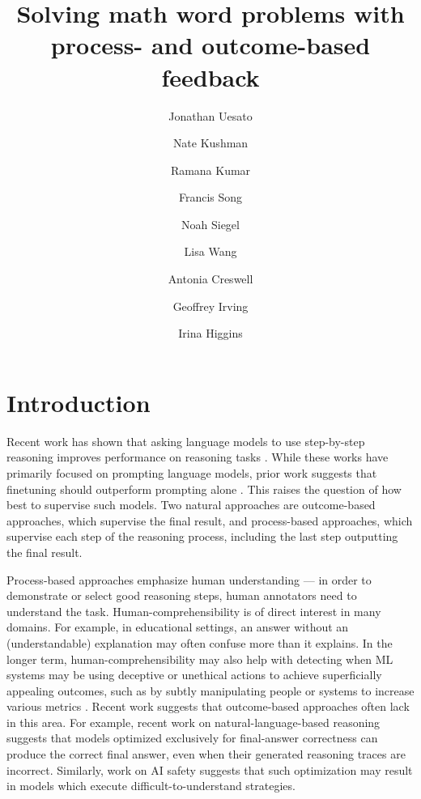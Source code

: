 \documentclass[11pt, a4paper, logo]{deepmind}
\title{Solving math word problems with process- and outcome-based feedback}
\author[1*]{Jonathan Uesato}
\author[1*]{Nate Kushman}
\author[1*]{Ramana Kumar}
\author[1]{Francis Song}
\author[1]{Noah Siegel}
\author[1]{Lisa Wang}
\author[1]{Antonia Creswell}
\author[1]{Geoffrey Irving}
\author[1]{Irina Higgins}
\affil[1]{DeepMind}
\affil[*]{Equal contributions}
\begin{document}
\maketitle

\section{Introduction}
\label{sec:intro}

Recent work has shown that asking language models to use step-by-step reasoning improves performance on reasoning tasks \citep{shwartz2020unsupervised, nakano2021webgpt, cobbe2021training, wei2022chain, kojima2022large, minerva2022}.
While these works have primarily focused on prompting language models, prior work suggests that finetuning should outperform prompting alone \citep{stiennon2020learning, perez2021true, ouyang2022training}.
This raises the question of how best to supervise such models.
Two natural approaches are outcome-based approaches, which supervise the final result, and process-based approaches, which supervise each step of the reasoning process, including the last step outputting the final result.

Process-based approaches emphasize human understanding --- in order to demonstrate or select good reasoning steps, human annotators need to understand the task. Human-comprehensibility is of direct interest in many domains. For example, in educational settings, an answer without an (understandable) explanation may often confuse more than it explains. In the longer term, human-comprehensibility may also help with detecting when ML systems may be using deceptive or unethical actions to achieve superficially appealing outcomes, such as by subtly manipulating people or systems to increase various metrics \citep{amodei2016concrete}. Recent work suggests that outcome-based approaches often lack in this area. For example, recent work on natural-language-based reasoning \citep{zelikman2022star, creswell2022selection} suggests that 
models optimized exclusively for final-answer correctness can produce the correct final answer, even when their generated reasoning traces are incorrect.
Similarly, work on AI safety \citep{ought2022supervise, krakovna2020specification} suggests that such optimization may result in models which execute difficult-to-understand strategies.
\end{document}
